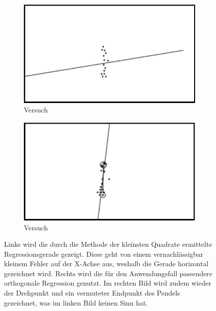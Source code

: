 \begin{figure}
    \centering
    \begin{subfigure}[t]{0.45\textwidth}
        \includegraphics[width=\textwidth]{gfx/pendel2_4.png}
        \caption{Versuch }
        \label{fig:pendel2_4}
    \end{subfigure}
    \begin{subfigure}[t]{0.45\textwidth}
        \includegraphics[width=\textwidth]{gfx/pendel2_5.png}
        \caption{Versuch }
        \label{fig:regression_compare}
    \end{subfigure}
    \caption[Versuche  und ]{Links wird die durch die Methode der kleinsten Quadrate ermittelte Regressionsgerade gezeigt. Diese geht von einem vernachlässigbar kleinem Fehler auf der X-Achse aus, weshalb die Gerade horizontal gezeichnet wird. Rechts wird die für den Anwendungsfall passendere orthogonale Regression genutzt. Im rechten Bild wird zudem wieder der Drehpunkt und ein vermuteter Endpunkt des Pendels gezeichnet, was im linken Bild keinen Sinn hat.}
    \label{fig:pendel2_4_5}
\end{figure}

